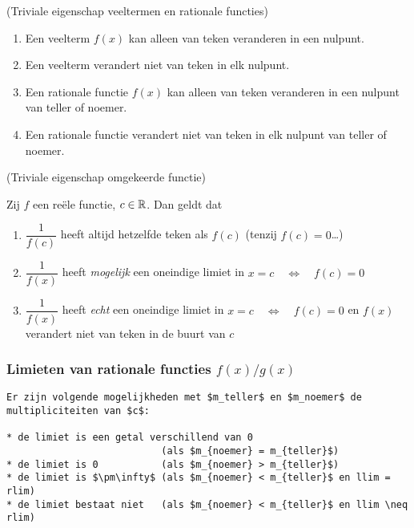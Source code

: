 \documentclass[numbers]{ximera}
\begin{document}
\begin{proposition} (Triviale eigenschap veeltermen en rationale functies)
\begin{enumerate}
	\item Een veelterm $f(x)$ kan alleen van teken veranderen in een nulpunt. 
	\item Een veelterm verandert niet van teken in elk nulpunt.
	\item Een rationale functie $f(x)$ kan alleen van teken veranderen in een nulpunt van teller of noemer. 
	\item Een rationale functie  verandert niet van teken in elk nulpunt van teller of noemer.
\end{enumerate}
\end{proposition}

\begin{proposition} (Triviale eigenschap omgekeerde functie)
	
Zij $f$ een reële functie, $c\in\mathbb{R}$. Dan geldt dat
\begin{enumerate}
\item	$\dfrac{1}{f(c)}$ heeft altijd hetzelfde teken als $f(c)$  \quad(tenzij $f(c)=0$\dots)

\item    $\dfrac{1}{f(x)}$ heeft \textit{mogelijk} een oneindige limiet in $x=c \quad\iff\quad f(c)=0$ 

\item    $\dfrac{1}{f(x)}$ heeft \textit{echt} een oneindige limiet in $x=c \quad\iff\quad f(c)=0$ en $f(x)$ verandert niet van teken in de buurt van $c$ 
\end{enumerate}
\end{proposition}

\subsubsection{Limieten van rationale functies $f(x)/g(x)$}

\begin{verbatim}
Er zijn volgende mogelijkheden met $m_teller$ en $m_noemer$ de multipliciteiten van $c$:

* de limiet is een getal verschillend van 0  
                           (als $m_{noemer} = m_{teller}$)
* de limiet is 0           (als $m_{noemer} > m_{teller}$)
* de limiet is $\pm\infty$ (als $m_{noemer} < m_{teller}$ en llim = rlim)
* de limiet bestaat niet   (als $m_{noemer} < m_{teller}$ en llim \neq rlim)

\end{verbatim}
\end{document}

